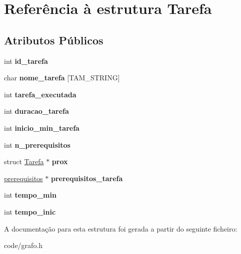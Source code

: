 \hypertarget{structTarefa}{\section{Referência à estrutura Tarefa}
\label{structTarefa}
}
\subsection*{Atributos Públicos}
\begin{DoxyCompactItemize}
\item 
\hypertarget{structTarefa_a1509b75b75f758e2d0502df4162366f2}{int {\bfseries id\-\_\-tarefa}}\label{structTarefa_a1509b75b75f758e2d0502df4162366f2}

\item 
\hypertarget{structTarefa_a43c0db59f4e6a3031ef2a5951ad8910f}{char {\bfseries nome\-\_\-tarefa} \mbox{[}T\-A\-M\-\_\-\-S\-T\-R\-I\-N\-G\mbox{]}}\label{structTarefa_a43c0db59f4e6a3031ef2a5951ad8910f}

\item 
\hypertarget{structTarefa_a86ef331b855e3f91eec492a00171cc9c}{int {\bfseries tarefa\-\_\-executada}}\label{structTarefa_a86ef331b855e3f91eec492a00171cc9c}

\item 
\hypertarget{structTarefa_a7962bef326f487f4ffa7dc0f04153729}{int {\bfseries duracao\-\_\-tarefa}}\label{structTarefa_a7962bef326f487f4ffa7dc0f04153729}

\item 
\hypertarget{structTarefa_a7d09c30d0162c55a0aab1ad71716fae6}{int {\bfseries inicio\-\_\-min\-\_\-tarefa}}\label{structTarefa_a7d09c30d0162c55a0aab1ad71716fae6}

\item 
\hypertarget{structTarefa_a9f6369cef91f4b9d544d9e1be0bc705f}{int {\bfseries n\-\_\-prerequisitos}}\label{structTarefa_a9f6369cef91f4b9d544d9e1be0bc705f}

\item 
\hypertarget{structTarefa_a1b0bbf147698174596c486d12afa254e}{struct \hyperlink{structTarefa}{Tarefa} $\ast$ {\bfseries prox}}\label{structTarefa_a1b0bbf147698174596c486d12afa254e}

\item 
\hypertarget{structTarefa_abdbaac144f089e939832a4d6cbf0759a}{\hyperlink{structPreRequisitos}{prerequisitos} $\ast$ {\bfseries prerequisitos\-\_\-tarefa}}\label{structTarefa_abdbaac144f089e939832a4d6cbf0759a}

\item 
\hypertarget{structTarefa_a4fd1b4c3fd98a3fb754116f6cc80c906}{int {\bfseries tempo\-\_\-min}}\label{structTarefa_a4fd1b4c3fd98a3fb754116f6cc80c906}

\item 
\hypertarget{structTarefa_a202a3c8fbee0bf74488fa057587f13df}{int {\bfseries tempo\-\_\-inic}}\label{structTarefa_a202a3c8fbee0bf74488fa057587f13df}

\end{DoxyCompactItemize}


A documentação para esta estrutura foi gerada a partir do seguinte ficheiro\-:\begin{DoxyCompactItemize}
\item 
code/grafo.\-h\end{DoxyCompactItemize}
